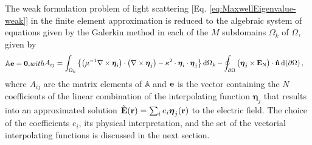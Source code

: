 The weak formulation problem of light scattering  [Eq. \eqref{eq:MaxwellEigenvalue-weak}] in the finite element approximation is reduced to the algebraic system of equations given by the Galerkin method in each of the $M$ subdomains $\Omega_k$ of $\Omega$, given by \cite{larson_finite_2013,jin_theory_2010}
%
\begin{subequations}
        \label{eq:Vec-FEM}
\begin{align}
    \mathbb{A} \vb{e} = \vb{0},
\end{align}%
with
\begin{align}
    A_{ij}  =     \int_{\Omega_k} \left\{\qty(\mu^{-1}\nabla\times\boldsymbol{\eta}_i)\cdot \qty(\nabla\times\boldsymbol{\eta}_j) -  \kappa^2  \cdot   \boldsymbol{\eta}_i \cdot \boldsymbol{\eta}_j \right\} \dd{\Omega_k}
            -& \oint_{\partial\Omega} \qty(\boldsymbol{\eta}_j\times \vb{E}_\text{N}) \cdot\vu{n}\dd{(\partial\Omega)},
\end{align}%
\end{subequations}%
\noindent%
%
where $A_{ij}$ are the matrix elements of $\mathbb{A}$ and  $\vb{e}$ is the vector containing the $N$ coefficients of the linear combination of the interpolating function $\boldsymbol{\eta}_j$ that results into an approximated solution $\tilde{\vb{E}}(\vb{r}) = \sum_i e_i \boldsymbol{\eta}_j(\vb{r})$ to the electric field. The choice of the coefficients $e_i$, its physical interpretation, and the set of the vectorial interpolating functions  is discussed in the next section.
